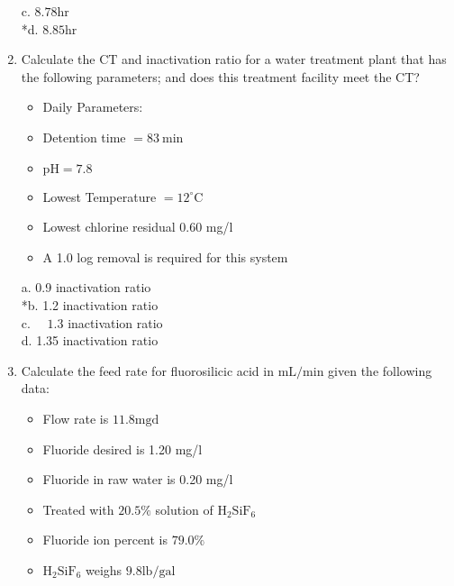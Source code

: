 \begin{enumerate}
c. $8.78 \mathrm{hr}$\\
*d. $8.85 \mathrm{hr}$\\
  \item Calculate the $\mathrm{CT}$ and inactivation ratio for a water treatment plant that has the following parameters; and does this treatment facility meet the CT?\\
\begin{itemize}
  \item Daily Parameters:\\
  \item Detention time $=83 \mathrm{~min}$\\
  \item $\mathrm{pH}=7.8$\\
  \item Lowest Temperature $=12^{\circ} \mathrm{C}$\\
  \item Lowest chlorine residual 0.60 mg/l\\
  \item A 1.0 log removal is required for this system\\
\end{itemize}
a. 0.9 inactivation ratio\\
*b. 1.2 inactivation ratio\\
c. $\quad 1.3$ inactivation ratio\\
d. 1.35 inactivation ratio\\
  \item Calculate the feed rate for fluorosilicic acid in $\mathrm{mL} / \mathrm{min}$ given the following data:\\
\begin{itemize}
  \item Flow rate is $11.8 \mathrm{mgd}$\\
  \item Fluoride desired is 1.20 mg/l\\
  \item Fluoride in raw water is 0.20 mg/l\\
  \item Treated with $20.5 \%$ solution of $\mathrm{H}_{2} \mathrm{SiF}_{6}$\\
  \item Fluoride ion percent is $79.0 \%$\\
  \item $\mathrm{H}_{2} \mathrm{SiF}_{6}$ weighs $9.8 \mathrm{lb} / \mathrm{gal}$\\
\end{itemize}

\end{enumerate}
